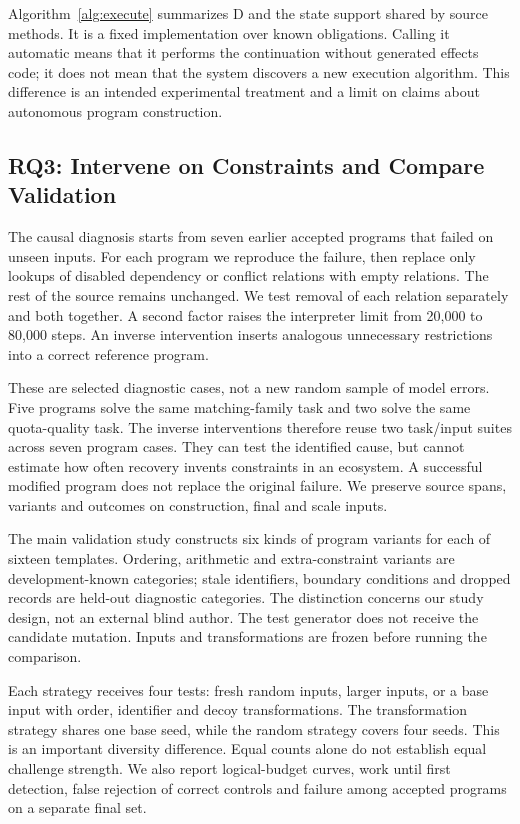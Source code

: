 \documentclass[conference]{IEEEtran}
\begin{document}
Algorithm~\ref{alg:execute} summarizes D and the state support shared by source methods. It is a fixed implementation over known obligations. Calling it automatic means that it performs the continuation without generated effects code; it does not mean that the system discovers a new execution algorithm. This difference is an intended experimental treatment and a limit on claims about autonomous program construction.

\subsection{RQ3: Intervene on Constraints and Compare Validation}
The causal diagnosis starts from seven earlier accepted programs that failed on unseen inputs. For each program we reproduce the failure, then replace only lookups of disabled dependency or conflict relations with empty relations. The rest of the source remains unchanged. We test removal of each relation separately and both together. A second factor raises the interpreter limit from 20,000 to 80,000 steps. An inverse intervention inserts analogous unnecessary restrictions into a correct reference program.

These are selected diagnostic cases, not a new random sample of model errors. Five programs solve the same matching-family task and two solve the same quota-quality task. The inverse interventions therefore reuse two task/input suites across seven program cases. They can test the identified cause, but cannot estimate how often recovery invents constraints in an ecosystem. A successful modified program does not replace the original failure. We preserve source spans, variants and outcomes on construction, final and scale inputs.

The main validation study constructs six kinds of program variants for each of sixteen templates. Ordering, arithmetic and extra-constraint variants are development-known categories; stale identifiers, boundary conditions and dropped records are held-out diagnostic categories. The distinction concerns our study design, not an external blind author. The test generator does not receive the candidate mutation. Inputs and transformations are frozen before running the comparison.

Each strategy receives four tests: fresh random inputs, larger inputs, or a base input with order, identifier and decoy transformations. The transformation strategy shares one base seed, while the random strategy covers four seeds. This is an important diversity difference. Equal counts alone do not establish equal challenge strength. We also report logical-budget curves, work until first detection, false rejection of correct controls and failure among accepted programs on a separate final set.
\end{document}
